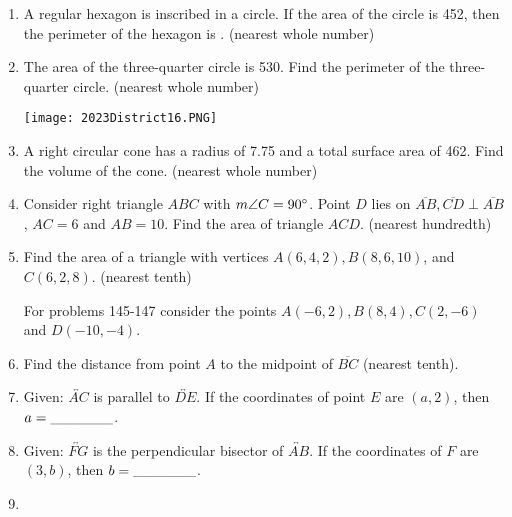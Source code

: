 \documentclass[../uilmath.tex]{subfiles}
\begin{document}
\begin{enumerate}[label=\bfseries\arabic*.]
    \item %
    A regular hexagon is inscribed in a circle. If the area of the circle is 452, then the perimeter of the hexagon is \blank. (nearest whole number)

    \item %
    The area of the three-quarter circle is 530. Find the perimeter of the three-quarter circle. (nearest whole number)
    \begin{center}
        \texttt{[image: 2023District16.PNG]}
    \end{center}

    \item %
    A right circular cone has a radius of 7.75 and a total surface area of 462. Find the volume of the cone. (nearest whole number)

    \item %
    Consider right triangle $ABC$ with $m\angle C = 90\degree$. Point $D$ lies on $\overline{AB}, \overline{CD}\perp \overline{AB}$, $AC=6$ and $AB=10$.
    Find the area of triangle $ACD$. (nearest hundredth)

    \item %
    Find the area of a triangle with vertices $A(6,4,2), B(8,6,10)$, and $C(6,2,8)$. (nearest tenth)    
    
    
    For problems 145-147 consider the points $A(-6,2), B(8,4), C(2,-6)$ and $D(-10,-4)$.
    \item %
    Find the distance from point $A$ to the midpoint of $\overline{BC}$ (nearest tenth).

    \item %
    Given: $\overleftrightarrow{AC}$ is parallel to $\overleftrightarrow{DE}$. If the coordinates of point $E$ are $(a,2)$, then $a=\_\_\_\_\_\_$.
    
    \item %
    Given: $\overleftrightarrow{FG}$ is the perpendicular bisector of $\overleftrightarrow{AB}$. If the coordinates of $F$ are $(3,b)$, then $b=\_\_\_\_\_\_$.

    \item %
    

\end{enumerate}
\end{document}
